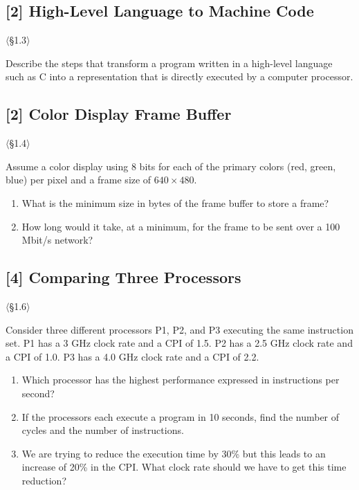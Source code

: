 \problembreak %

\subsection{[2] High-Level Language to Machine Code}
\hypertarget{prob-1.3}{}
\noindent$\langle$\S1.3$\rangle$\medskip

\noindent Describe the steps that transform a program written in a high-level language
such as C into a representation that is directly executed by a computer
processor.

\ifprintversion\vfill\else\bigskip\fi %

\subsection{[2] Color Display Frame Buffer}
\hypertarget{prob-1.4}{}
\noindent$\langle$\S1.4$\rangle$\medskip

\noindent Assume a color display using 8 bits for each of the primary colors (red,
green, blue) per pixel and a frame size of $640 \times 480$.

\begin{enumerate}
  \item[a.] What is the minimum size in bytes of the frame buffer to store a
        frame?
  \item[b.] How long would it take, at a minimum, for the frame to be sent
        over a 100 Mbit/s network?
\end{enumerate}

\problembreak %

\subsection{[4] Comparing Three Processors}
\hypertarget{prob-1.5}{}
\noindent$\langle$\S1.6$\rangle$\medskip

\noindent Consider three different processors P1, P2, and P3 executing the same
instruction set. P1 has a 3 GHz clock rate and a CPI of 1.5. P2 has a 2.5
GHz clock rate and a CPI of 1.0. P3 has a 4.0 GHz clock rate and a CPI of
2.2.

\begin{enumerate}
  \item[a.] Which processor has the highest performance expressed in
        instructions per second?
  \item[b.] If the processors each execute a program in 10 seconds, find the
        number of cycles and the number of instructions.
  \item[c.] We are trying to reduce the execution time by 30\% but this leads
        to an increase of 20\% in the CPI. What clock rate should we have to
        get this time reduction?
\end{enumerate}

